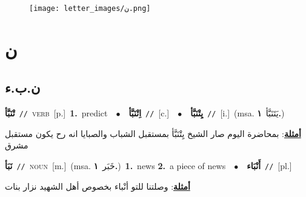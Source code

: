 \documentclass[10pt,a4paper,twoside]{article} %
\begin{document}
\begin{figure*}[t!]\centering\texttt{[image: letter\_images/ن.png]}\end{figure*}
\color{white}

 \section*{\foreignlanguage{arabic}{ن}} 
 \begin{multicols}{2} 

%
\color{black}
\vspace{-3mm}
\subsection*{\color{blue}\foreignlanguage{arabic}{ن.ب.ء}\color{blue}{}} 

{\setlength\topsep{0pt}\textbf{\foreignlanguage{arabic}{تْنَبَّأ}}\ {\color{gray}\texttt{//}\color{black}}\ \textsc{verb}\ [p.]\ \textbf{1.}~predict\ \ $\bullet$\ \ \setlength\topsep{0pt}\textbf{\foreignlanguage{arabic}{اِتْنَبَّأ}}\ {\color{gray}\texttt{//}\color{black}}\ [c.]\ \ $\bullet$\ \ \setlength\topsep{0pt}\textbf{\foreignlanguage{arabic}{يِتْنَبَّأ}}\ {\color{gray}\texttt{//}\color{black}}\ [i.]\ \color{gray}(msa. \foreignlanguage{arabic}{يَتَنَبَّأ}~\foreignlanguage{arabic}{\textbf{١.}})\color{black}\  \begin{flushright}\color{gray}\foreignlanguage{arabic}{\textbf{\underline{\foreignlanguage{arabic}{أمثلة}}}: بمحاضرة اليوم صار الشيخ يِتْنَبَّأ بمستقبل الشباب والصبايا انه رح يكون مستقبل مشرق}\end{flushright}\color{black}} \vspace{2mm}

{\setlength\topsep{0pt}\textbf{\foreignlanguage{arabic}{نَبَأ}}\ {\color{gray}\texttt{//}\color{black}}\ \textsc{noun}\ [m.]\ \color{gray}(msa. \foreignlanguage{arabic}{خَبَر}~\foreignlanguage{arabic}{\textbf{١.}})\color{black}\ \textbf{1.}~news  \textbf{2.}~a piece of news\ \ $\bullet$\ \ \setlength\topsep{0pt}\textbf{\foreignlanguage{arabic}{أَنْبَاء}}\ {\color{gray}\texttt{//}\color{black}}\ [pl.]\  \begin{flushright}\color{gray}\foreignlanguage{arabic}{\textbf{\underline{\foreignlanguage{arabic}{أمثلة}}}: وصلتنا للتو أنْباء بخصوص أهل الشهيد نزار بنات}\end{flushright}\color{black}} \vspace{2mm}


\end{multicols}
\end{document}
